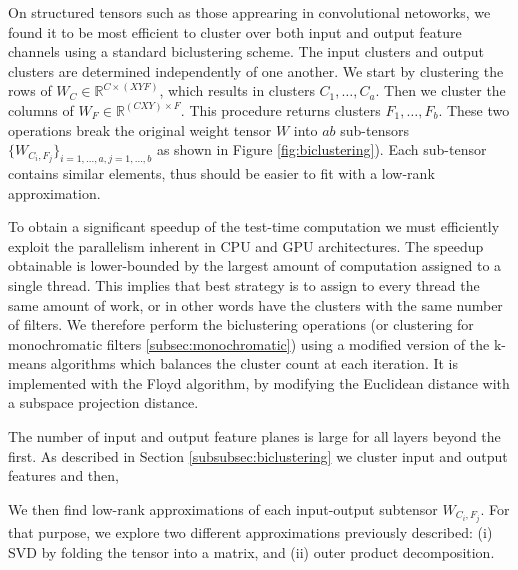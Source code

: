 On structured tensors such as those apprearing in convolutional netoworks,
we found it to be most efficient to cluster
over both input and output feature channels using a standard biclustering scheme.
 The input clusters and output clusters are determined independently of one another. 
We start by clustering the rows of $W_C \in \mathbb{R}^{C \times (XYF)}$, which results in
clusters $C_1, \dots, C_a$. Then we cluster the columns of $W_F  \in
\mathbb{R}^{(CXY) \times F}$. This procedure returns clusters $F_1,
\dots, F_b$. These two operations break the original weight tensor $W$
into $ab$ sub-tensors $\{W_{C_i, F_j}\}_{i = 1, \dots, a, j = 1,
  \dots, b}$ as shown in Figure \ref{fig:biclustering}). Each
sub-tensor contains similar elements, thus should be easier to
fit with a low-rank approximation. 

To obtain a significant speedup of the test-time computation we must
efficiently exploit the parallelism inherent in CPU and GPU
architectures. The speedup obtainable is lower-bounded by the largest
amount of computation assigned to a single thread. This implies that
best strategy is to assign to every thread the same amount of work, or in other words
have the clusters with the same number of filters. 
We therefore perform the biclustering operations (or clustering 
for monochromatic filters \ref{subsec:monochromatic}) using a modified
version of the k-means algorithms which balances the cluster count at
each iteration. 
It is implemented with the Floyd algorithm, by modifying the Euclidean distance
with a subspace projection distance.

The number of  input and output feature planes is large for all layers
beyond the first. As described in Section
\ref{subsubsec:biclustering} we cluster input and output features and then, 

We then find low-rank approximations of each input-output subtensor $W_{C_i, F_j}$.
For that purpose, we explore two different approximations previously described: (i) SVD by folding the tensor into a matrix,
and (ii) outer product decomposition.


